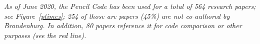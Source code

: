 \documentclass[12pt]{article}
\begin{document}
{\em
As of June 2020, the {\sc Pencil Code} has been used for a total of
564 research papers; see Figure~\ref{ptimes};
254 of those are papers (45\%) are not co-authored by Brandenburg. %
In addition, 80 papers reference it for code comparison or other purposes %
(see the red line).
}
%
%
\end{document}
